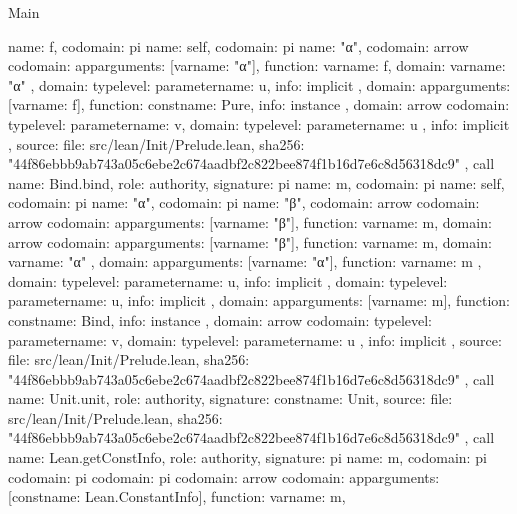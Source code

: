 \begin{lexlean}{Main}
\begin{toolingmodule}
{{{        name: f,
        codomain: pi{
          name: self,
          codomain: pi{
            name: "α",
            codomain: arrow{
              codomain: app{arguments: [var{name: "α"}], function: var{name: f}},
              domain: var{name: "α"}
            },
            domain: type{level: parameter{name: u}},
            info: implicit
          },
          domain: app{arguments: [var{name: f}], function: const{name: Pure}},
          info: instance
        },
        domain: arrow{
          codomain: type{level: parameter{name: v}},
          domain: type{level: parameter{name: u}}
        },
        info: implicit
      },
      source: {
        file: src/lean/Init/Prelude.lean,
        sha256: "44f86ebbb9ab743a05c6ebe2c674aadbf2c822bee874f1b16d7e6c8d56318dc9"
      }
    },
    call{
      name: Bind.bind,
      role: authority,
      signature: pi{
        name: m,
        codomain: pi{
          name: self,
          codomain: pi{
            name: "α",
            codomain: pi{
              name: "β",
              codomain: arrow{
                codomain: arrow{
                  codomain: app{arguments: [var{name: "β"}], function: var{name: m}},
                  domain: arrow{
                    codomain: app{arguments: [var{name: "β"}], function: var{name: m}},
                    domain: var{name: "α"}
                  }
                },
                domain: app{arguments: [var{name: "α"}], function: var{name: m}}
              },
              domain: type{level: parameter{name: u}},
              info: implicit
            },
            domain: type{level: parameter{name: u}},
            info: implicit
          },
          domain: app{arguments: [var{name: m}], function: const{name: Bind}},
          info: instance
        },
        domain: arrow{
          codomain: type{level: parameter{name: v}},
          domain: type{level: parameter{name: u}}
        },
        info: implicit
      },
      source: {
        file: src/lean/Init/Prelude.lean,
        sha256: "44f86ebbb9ab743a05c6ebe2c674aadbf2c822bee874f1b16d7e6c8d56318dc9"
      }
    },
    call{
      name: Unit.unit,
      role: authority,
      signature: const{name: Unit},
      source: {
        file: src/lean/Init/Prelude.lean,
        sha256: "44f86ebbb9ab743a05c6ebe2c674aadbf2c822bee874f1b16d7e6c8d56318dc9"
      }
    },
    call{
      name: Lean.getConstInfo,
      role: authority,
      signature: pi{
        name: m,
        codomain: pi{
          codomain: pi{
            codomain: pi{
              codomain: arrow{
                codomain: app{arguments: [const{name: Lean.ConstantInfo}], function: var{name: m}},
}}}}}}}
\end{toolingmodule}
\end{lexlean}
